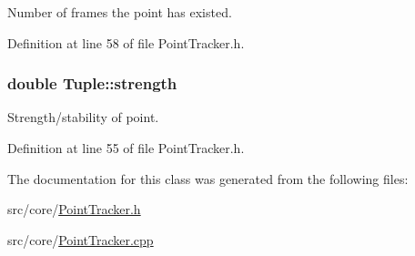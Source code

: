 \-Number of frames the point has existed. 



\-Definition at line 58 of file \-Point\-Tracker.\-h.

\hypertarget{class_tuple_aa2e3ef0462fe1ffb96028cbe5f8324c9}{
\subsubsection[{strength}]{\setlength{\rightskip}{0pt plus 5cm}double {\bf \-Tuple\-::strength}}}
\label{class_tuple_aa2e3ef0462fe1ffb96028cbe5f8324c9}


\-Strength/stability of point. 



\-Definition at line 55 of file \-Point\-Tracker.\-h.



\-The documentation for this class was generated from the following files\-:\begin{DoxyCompactItemize}
\item 
src/core/\hyperlink{_point_tracker_8h}{\-Point\-Tracker.\-h}\item 
src/core/\hyperlink{_point_tracker_8cpp}{\-Point\-Tracker.\-cpp}\end{DoxyCompactItemize}
